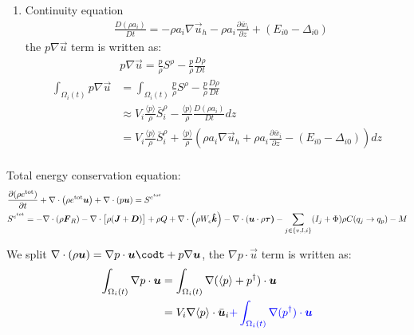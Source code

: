 \documentclass{report}
\begin{document}
\begin{enumerate}
\item Continuity equation
\begin{align*}
    &\frac{D(\rho a_i)}{D t} = -\rho a_i \nabla \vec{u}_h  - \rho a_i \frac{\partial \bar{w}_i}{\partial z} + (E_{i0} - \Delta_{i0})
\end{align*}
the $p \nabla \vec{u}$ term is written as:
\begin{align*}
    &p\nabla \vec{u} =\frac{p}{\rho} S^{\rho} - \frac{p}{\rho} \frac{D\rho}{D t}\\
    \int_{\Omega_i(t)} p \nabla\vec{u} &= 
    \int_{\Omega_i(t)} \frac{p}{\rho} S^{\rho} - \frac{p}{\rho} \frac{D\rho}{D t} \\
    &\approx V_i  \frac{\langle p \rangle}{\rho} \bar{S}_i^{\rho} -  \frac{\langle p \rangle }{\rho} \frac{D(\rho a_i)}{D t} dz \\
    &= V_i  \frac{\langle p \rangle}{\rho} \bar{S}_i^{\rho} +  \frac{\langle p \rangle }{\rho} \left(\rho a_i \nabla \vec{u}_h  + \rho a_i \frac{\partial \bar{w}_i}{\partial z} - (E_{i0} - \Delta_{i0})\right) dz \\
\end{align*}
\end{enumerate}



\newpage
Total energy conservation equation:
\begin{align*}
& \diff{(\rho e^\mathrm{tot})}{t} + \divergence \left( \rho e^\mathrm{tot}\vec{u} \right) + \divergence \left( p\vec{u} \right)
 = S^{e^{tot}}\\
 & S^{e^{tot}} =  -\divergence (\rho \vec{F}_R) - \divergence \bigl[\rho (\vec{J} + \vec{D})\bigr] + \rho Q  
  + \divergence \left(\rho W_c \vec{\hat k} \right)  - \divergence (\vec{u} \cdot \rho\vec{\tau)}
   - \sum_{j\in\{v,l,i\}}(I_j + \Phi)  \rho C(q_j \rightarrow q_p) - M\\
\end{align*}

We split $\nabla\cdot(\rho \vec{u}) = \nabla p \cdot \vec{u} \codt   + p\nabla \vec{u}$, 
the $\nabla p \cdot \vec{u}$ term is written as:
\begin{align*}
    \int_{\Omega_i(t)} \nabla p \cdot \vec{u} &= \int_{\Omega_i(t)} \nabla(\langle p \rangle + p^{\dagger}) \cdot \vec{u}  \\
    & = V_i  \nabla\langle p \rangle  \cdot \bar{\vec{u}}_i  {\color{blue}+ \int_{\Omega_i(t)} \nabla(p^{\dagger}) \cdot \vec{u} } 
\end{align*}
\end{document}
